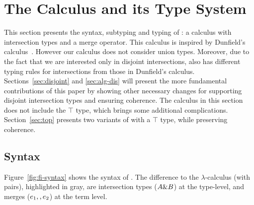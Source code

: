 \section{The \name Calculus and its Type System}
\label{sec:fi}

This section presents the syntax, subtyping and typing of \name: 
a calculus with intersection types and a merge
operator.  This calculus is inspired by Dunfield's
calculus~\cite{dunfield2014elaborating}.  However our calculus does
not consider union types. Moreover, due to the fact that we are
interested only in disjoint intersections, \name also has different
typing rules for intersections from those in Dunfield's calculus. Sections~\ref{sec:disjoint}
and \ref{sec:alg-dis} will present the more fundamental contributions
of this paper by showing other necessary changes for supporting
disjoint intersection types and ensuring coherence. The calculus in
this section does not include the $\top$ type, which brings some
additional complications.  Section~\ref{sec:top} presents two variants of
\name with a $\top$ type, while preserving coherence.

\subsection{Syntax}

Figure~\ref{fig:fi-syntax} shows the syntax of \name. The difference to the
$\lambda$-calculus (with pairs), highlighted in gray, are intersection types 
($A \& B$) at
the type-level, and merges ($e_1 ,, e_2$) at the term level.

